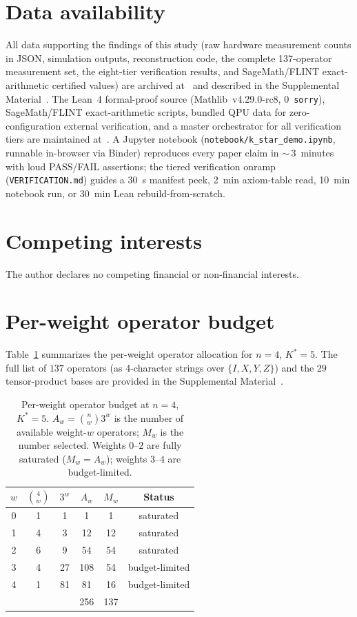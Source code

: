 \documentclass[twocolumn,prx,aps,superscriptaddress,longbibliography,floatfix]{revtex4-2}
\begin{document}
\section*{Data availability}
All data supporting the findings of this study (raw hardware
measurement counts in JSON, simulation outputs, reconstruction
code, the complete 137-operator measurement set, the eight-tier
verification results, and SageMath/FLINT exact-arithmetic certified
values) are archived at~\cite{zenodo} and described in the Supplemental
Material~\cite{supplemental}.
The Lean~4 formal-proof source (Mathlib~v4.29.0-rc8,
0~\texttt{sorry}), SageMath/FLINT exact-arithmetic scripts,
bundled QPU data for zero-configuration external
verification, and a master orchestrator for all verification tiers
are maintained at~\cite{github_verification}.
A Jupyter notebook (\texttt{notebook/k\_star\_demo.ipynb},
runnable in-browser via Binder) reproduces every paper claim
in ${\sim}\,3$~minutes with loud PASS/FAIL assertions; the
tiered verification onramp (\texttt{VERIFICATION.md}) guides a
30~s manifest peek, 2~min axiom-table read, 10~min notebook
run, or 30~min Lean rebuild-from-scratch.

\section*{Competing interests}
The author declares no competing financial or non-financial interests.

\appendix
\section{Per-weight operator budget}
\label{app:pauli-set}

Table~\ref{tab:budget} summarizes the per-weight operator allocation
for $n = 4$, $K^* = 5$.  The full list of $137$ operators (as
4-character strings over $\{I,X,Y,Z\}$) and the $29$ tensor-product
bases are provided in the Supplemental Material~\cite{supplemental}.

\begin{table}[h]
\centering
\caption{Per-weight operator budget at $n = 4$, $K^* = 5$.
$A_w = \binom{n}{w} 3^w$ is the number of available weight-$w$
operators; $M_w$ is the number selected.  Weights $0$--$2$ are
fully saturated ($M_w = A_w$); weights $3$--$4$ are budget-limited.}
\label{tab:budget}
\begin{tabular}{cccccc}
\toprule
$w$ & $\binom{4}{w}$ & $3^w$ & $A_w$ & $M_w$ & Status \\
\midrule
0 & 1 & 1  &   1 &  1 & saturated \\
1 & 4 & 3  &  12 & 12 & saturated \\
2 & 6 & 9  &  54 & 54 & saturated \\
3 & 4 & 27 & 108 & 54 & budget-limited \\
4 & 1 & 81 &  81 & 16 & budget-limited \\
\midrule
  &   &    & 256 & 137 & \\
\bottomrule
\end{tabular}
\end{table}
\end{document}
